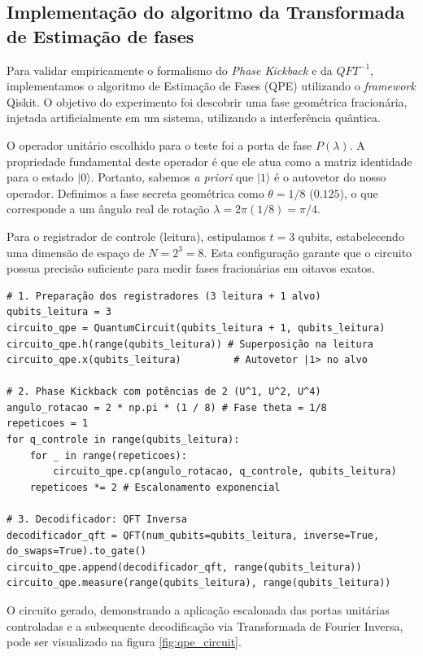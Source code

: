 \documentclass[12pt, a4paper]{article}
\newcommand{\ket}[1]{\lvert #1 \rangle}
\begin{document}
\subsection{Implementação do algoritmo da Transformada de Estimação de fases}

Para validar empiricamente o formalismo do \textit{Phase Kickback} e da $QFT^{-1}$, implementamos o algoritmo de Estimação de Fases (QPE) utilizando o \textit{framework} Qiskit. O objetivo do experimento foi descobrir uma fase geométrica fracionária, injetada artificialmente em um sistema, utilizando a interferência quântica.

O operador unitário escolhido para o teste foi a porta de fase $P(\lambda)$. A propriedade fundamental deste operador é que ele atua como a matriz identidade para o estado $\ket{0}$. Portanto, sabemos \textit{a priori} que $\ket{1}$ é o autovetor do nosso operador. Definimos a fase secreta geométrica como $\theta = 1/8$ ($0.125$), o que corresponde a um ângulo real de rotação $\lambda = 2\pi(1/8) = \pi/4$.

Para o registrador de controle (leitura), estipulamos $t = 3$ qubits, estabelecendo uma dimensão de espaço de $N = 2^3 = 8$. Esta configuração garante que o circuito possua precisão suficiente para medir fases fracionárias em oitavos exatos.

\begin{lstlisting}[caption={Implementação do algoritmo de Estimação de Fases (QPE) para extração da fase $\theta = 1/8$.}]
# 1. Preparação dos registradores (3 leitura + 1 alvo)
qubits_leitura = 3
circuito_qpe = QuantumCircuit(qubits_leitura + 1, qubits_leitura)
circuito_qpe.h(range(qubits_leitura)) # Superposição na leitura
circuito_qpe.x(qubits_leitura)         # Autovetor |1> no alvo

# 2. Phase Kickback com potências de 2 (U^1, U^2, U^4)
angulo_rotacao = 2 * np.pi * (1 / 8) # Fase theta = 1/8
repeticoes = 1
for q_controle in range(qubits_leitura):
    for _ in range(repeticoes):
        circuito_qpe.cp(angulo_rotacao, q_controle, qubits_leitura)
    repeticoes *= 2 # Escalonamento exponencial

# 3. Decodificador: QFT Inversa
decodificador_qft = QFT(num_qubits=qubits_leitura, inverse=True, do_swaps=True).to_gate()
circuito_qpe.append(decodificador_qft, range(qubits_leitura))
circuito_qpe.measure(range(qubits_leitura), range(qubits_leitura))
\end{lstlisting}

O circuito gerado, demonstrando a aplicação escalonada das portas unitárias controladas e a subsequente decodificação via Transformada de Fourier Inversa, pode ser visualizado na figura \ref{fig:qpe_circuit}.
\end{document}
